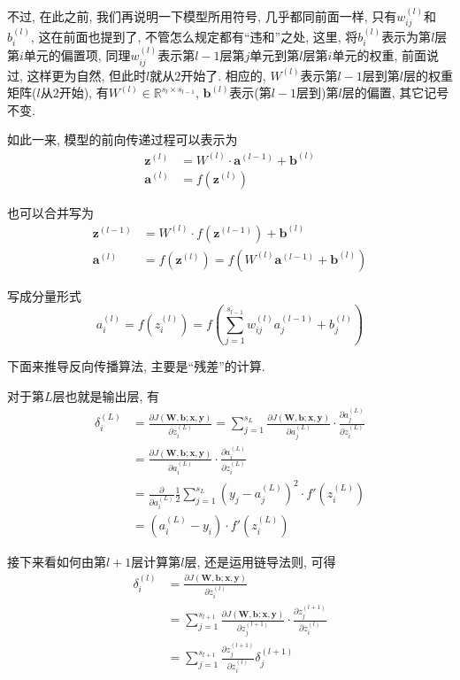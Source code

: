 \documentclass[a4paper,UTF8]{ctexart}
\theoremstyle{plain} \newtheorem{theorem}{定理}[section]
\theoremstyle{plain} \newtheorem{definition}{定义}[section]
\theoremstyle{plain} \newtheorem{lemma}{引理}[section]
\theoremstyle{plain} \newtheorem{proposition}{命题}[section]
\theoremstyle{plain} \newtheorem{example}{例}[section]
\theoremstyle{plain} \newtheorem{remark}{注}[section]
\theoremstyle{plain} \newtheorem{corollary}{推论}[section]
\begin{document}
不过, 在此之前, 我们再说明一下模型所用符号, 几乎都同前面一样, 只有$w_{ij}^{(l)}$和$b_{i}^{(l)}$, 这在前面也提到了, 不管怎么规定都有“违和”之处, 这里, 将$b_{i}^{(l)}$表示为第$l$层第$i$单元的偏置项, 同理$w_{ij}^{(l)}$表示第$l - 1$层第$j$单元到第$l$层第$i$单元的权重, 前面说过, 这样更为自然, 但此时$l$就从$2$开始了. 相应的, $W^{(l)}$表示第$l - 1$层到第$l$层的权重矩阵($l$从$2$开始), 有$W^{(l)} \in \mathbb{R}^{s_l \times s_{l-1}}$, $\bm{b}^{(l)}$表示(第$l-1$层到)第$l$层的偏置, 其它记号不变.

如此一来, 模型的前向传递过程可以表示为
\begin{align*}
\bm{z}^{(l)} & = W^{(l)} \cdot \bm{a}^{(l-1)} + \bm{b}^{(l)} \\ 
\bm{a}^{(l)} & = f(\bm{z}^{(l)})
\end{align*}

也可以合并写为
\begin{align*}
\bm{z}^{(l-1)} & = W^{(l)} \cdot f(\bm{z}^{(l-1)}) + \bm{b}^{(l)} \\
\bm{a}^{(l)} & = f(\bm{z}^{(l)}) = f(W^{(l)} \bm{a}^{(l-1)} + \bm{b}^{(l)})
\end{align*}

写成分量形式
\begin{equation*}
a_{i}^{(l)} = f(z_{i}^{(l)}) = f(\sum_{j=1}^{s_{l-1}} w_{ij}^{(l)} a_{j}^{(l-1)} + b_{j}^{(l)})
\end{equation*}

下面来推导反向传播算法, 主要是“残差”的计算.

对于第$L$层也就是输出层, 有
\begin{align*}
\delta_{i}^{(L)} & = \frac{\partial J(\bm{W},\bm{b};\bm{x},\bm{y})}{\partial z_{i}^{(L)}} = \sum_{j=1}^{s_L} \frac{\partial J(\bm{W},\bm{b};\bm{x},\bm{y})}{\partial a_{j}^{(L)}} \cdot \frac{\partial a_{j}^{(L)}}{\partial z_{i}^{(L)}} \\ 
& = \frac{\partial J(\bm{W},\bm{b};\bm{x},\bm{y})}{\partial a_{i}^{(L)}} \cdot \frac{\partial a_{i}^{(L)}}{\partial z_{i}^{(L)}} \\ 
& = \frac{\partial}{\partial a_{i}^{(L)}} \frac{1}{2} \sum_{j=1}^{s_L} (y_{j} - a_{j}^{(L)})^2 \cdot f'(z_{i}^{(L)}) \\ 
& = (a_{i}^{(L)} - y_{i}) \cdot f'(z_{i}^{(L)})
\end{align*}

接下来看如何由第$l + 1$层计算第$l$层, 还是运用链导法则, 可得
\begin{align*}
\delta_{i}^{(l)} & = \frac{\partial J(\bm{W},\bm{b};\bm{x},\bm{y})}{\partial z_{i}^{(l)}} \\ 
& = \sum_{j=1}^{s_{l+1}} \frac{\partial J(\bm{W},\bm{b};\bm{x},\bm{y})}{\partial z_{j}^{(l+1)}} \cdot \frac{\partial z_{j}^{(l+1)}}{\partial z_{i}^{(l)}} \\ 
& = \sum_{j=1}^{s_{l+1}}  \frac{\partial z_{j}^{(l+1)}}{\partial z_{i}^{(l)}} \delta_{j}^{(l+1)}
\end{align*}
\end{document}
